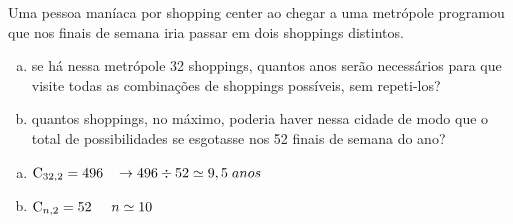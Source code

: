 \begin{ex}
Uma pessoa maníaca por shopping center  ao chegar a uma metrópole programou que nos finais de semana iria passar em dois shoppings distintos.
   \begin{enumerate}[(a)]
   \item se há nessa metrópole 32 shoppings, quantos anos serão necessários para que visite todas as combinações de shoppings possíveis, sem repeti-los?
   \item quantos shoppings, no máximo, poderia haver nessa cidade de modo que o total de possibilidades se esgotasse nos 52 finais de semana do ano?
   \end{enumerate}
     \begin{sol}
       \phantom{A} 
         \begin{enumerate} [(a)]
             \item $\mathrm{C}_{{32},2}=496 \hspace{0,3cm} \rightarrow 496\div52 \simeq 9,5 \hspace{0,1cm} anos$
             \item $\mathrm{C}_{n,2}=52\hspace{0,5cm}n\simeq 10$
         \end{enumerate}
     \end{sol}
\end{ex}